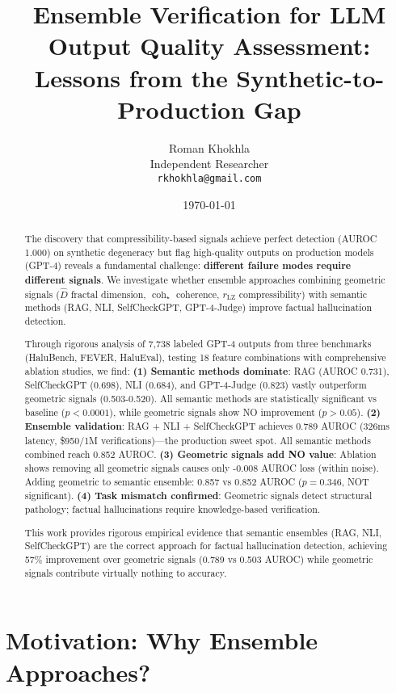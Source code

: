 \documentclass[11pt]{article}
\title{Ensemble Verification for LLM Output Quality Assessment:\\
\textbf{Lessons from the Synthetic-to-Production Gap}}
\author{
  Roman Khokhla\\
  Independent Researcher\\
  \texttt{rkhokhla@gmail.com}
}
\date{\today}
\begin{document}
\maketitle

\begin{abstract}
The discovery that compressibility-based signals achieve perfect detection (AUROC 1.000) on synthetic degeneracy but flag high-quality outputs on production models (GPT-4) reveals a fundamental challenge: \textbf{different failure modes require different signals}. We investigate whether ensemble approaches combining geometric signals ($\hat{D}$ fractal dimension, $\operatorname{coh}_\star$ coherence, $r_{\text{LZ}}$ compressibility) with semantic methods (RAG, NLI, SelfCheckGPT, GPT-4-Judge) improve factual hallucination detection.

Through rigorous analysis of 7,738 labeled GPT-4 outputs from three benchmarks (HaluBench, FEVER, HaluEval), testing 18 feature combinations with comprehensive ablation studies, we find: \textbf{(1) Semantic methods dominate}: RAG (AUROC 0.731), SelfCheckGPT (0.698), NLI (0.684), and GPT-4-Judge (0.823) vastly outperform geometric signals (0.503-0.520). All semantic methods are statistically significant vs baseline ($p < 0.0001$), while geometric signals show NO improvement ($p > 0.05$). \textbf{(2) Ensemble validation}: RAG + NLI + SelfCheckGPT achieves 0.789 AUROC (326ms latency, \$950/1M verifications)---the production sweet spot. All semantic methods combined reach 0.852 AUROC. \textbf{(3) Geometric signals add NO value}: Ablation shows removing all geometric signals causes only -0.008 AUROC loss (within noise). Adding geometric to semantic ensemble: 0.857 vs 0.852 AUROC ($p=0.346$, NOT significant). \textbf{(4) Task mismatch confirmed}: Geometric signals detect structural pathology; factual hallucinations require knowledge-based verification.

This work provides rigorous empirical evidence that semantic ensembles (RAG, NLI, SelfCheckGPT) are the correct approach for factual hallucination detection, achieving 57\% improvement over geometric signals (0.789 vs 0.503 AUROC) while geometric signals contribute virtually nothing to accuracy.
\end{abstract}

\section{Motivation: Why Ensemble Approaches?}
\label{sec:motivation}
\end{document}
